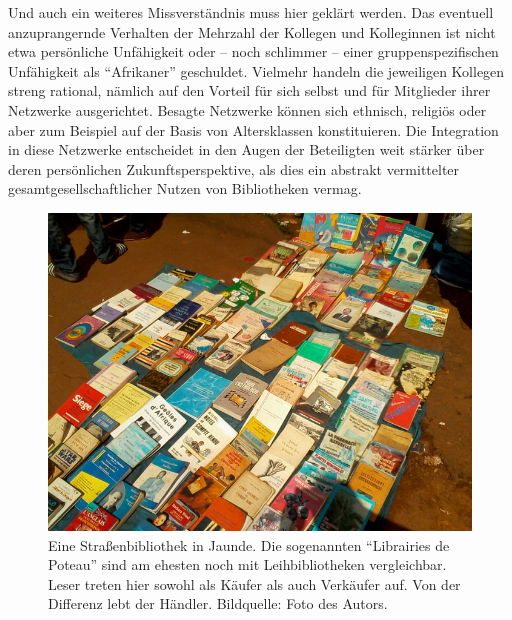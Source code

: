 \documentclass[a4paper,
fontsize=11pt,
oneside,
numbers=noperiodatend,
parskip=half-,
bibliography=totoc,
final
]{scrartcl}
\begin{document}
Und auch ein weiteres Missverständnis muss hier geklärt werden. Das
eventuell anzuprangernde Verhalten der Mehrzahl der Kollegen und
Kolleginnen ist nicht etwa persönliche Unfähigkeit oder -- noch
schlimmer -- einer gruppenspezifischen Unfähigkeit als
\enquote{Afrikaner} geschuldet. Vielmehr handeln die jeweiligen Kollegen
streng rational, nämlich auf den Vorteil für sich selbst und für
Mitglieder ihrer Netzwerke ausgerichtet. Besagte Netzwerke können sich
ethnisch, religiös oder aber zum Beispiel auf der Basis von
Altersklassen konstituieren. Die Integration in diese Netzwerke
entscheidet in den Augen der Beteiligten weit stärker über deren
persönlichen Zukunftsperspektive, als dies ein abstrakt vermittelter
gesamtgesellschaftlicher Nutzen von Bibliotheken vermag.

\begin{figure}[htbp]
\centering
\includegraphics{img/LibrairiePoteau1.jpg}
\caption{Eine Straßenbibliothek in Jaunde. Die sogenannten
\enquote{Librairies de Poteau} sind am ehesten noch mit Leihbibliotheken
vergleichbar. Leser treten hier sowohl als Käufer als auch Verkäufer
auf. Von der Differenz lebt der Händler. Bildquelle: Foto des Autors.}
\end{figure}
\end{document}

